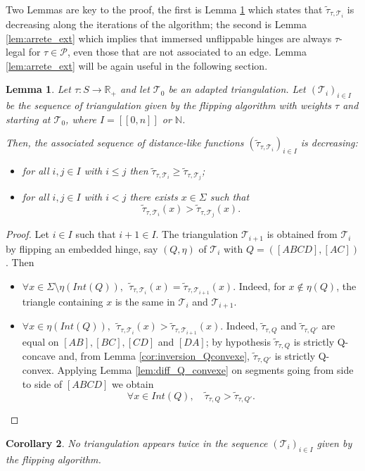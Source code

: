 \documentclass[a4paper,12pt]{article}
\def\NN{\mathbb N}
\def\lsem{[\![}
\def\rsem{]\!]}
\def\TT{\mathcal T}
\def\adm{\P}
\def\RR{\mathbb{R}}
\def\adm{\mathcal{P}}
\def\P{\mathcal{P}}
\newcommand{\tautilde}[2]{\widetilde\tau_{#1,#2}}
\newtheorem{lem}{Lemma}[section]		 %
\newtheorem{cor}[lem]{Corollary}
\theoremstyle{definition}
\begin{document}
						Two Lemmas are key to the proof, the first is Lemma \ref{lem:decroissante} which states that $\tautilde{\tau}{\TT_i}$ is decreasing along the iterations of the algorithm; the second is Lemma \ref{lem:arrete_ext} which implies that immersed unflippable hinges are always $\tau$-legal for $\tau\in \adm$, even those that are not associated to an edge. Lemma \ref{lem:arrete_ext} will be again useful in the following section.
												\begin{lem}\label{lem:decroissante}
						 Let $\tau: S \rightarrow \RR_+$ and let $\TT_0$ be an adapted triangulation. Let $(\TT_i)_{i\in I}$ be the sequence of triangulation given by 
						 the flipping algorithm with weights $\tau$ and starting at $\TT_0$, where
						 $I=\lsem 0,n\rsem$ or
						 $\NN$.

						 Then, the associated sequence of distance-like functions $(\tautilde{\tau}{\TT_i})_{i\in I}$ is decreasing:
						 \begin{itemize}
						 \item for all $i,j\in I$ with $i\leq j$ then $\tautilde{\tau}{\TT_i}\geq \tautilde{\tau}{\TT_j}$;
						 \item for all $i,j\in I$ with $i<j$ there exists $x\in \Sigma$ such that $$\tautilde{\tau}{\TT_i}(x)> \tautilde{\tau}{\TT_j}(x).$$
						 \end{itemize}
						\end{lem}
						\begin{proof} Let $i\in I$ such that $i+1\in I$.
						The triangulation $\TT_{i+1}$ is obtained from $\TT_i$ by flipping an embedded hinge, say $(Q,\eta)$ of $\TT_i$ with $Q=([ABCD],[AC])$.
						Then
						\begin{itemize}
						 \item $\forall x\in \Sigma\setminus \eta(Int(Q)),~~ \tautilde{\tau}{\TT_i}(x)=
						 \tautilde{\tau}{\TT_{i+1}}(x)$.
						Indeed, for $x\notin \eta(Q)$, the triangle containing $x$ is the same in $\TT_i$ and $\TT_{i+1}$.

						 \item $\forall x\in \eta(Int(Q)),~~ \tautilde{\tau}{\TT_i}(x)>\tautilde{\tau}{\TT_{i+1}}(x)$.
								Indeed, $\tautilde{\tau}{Q}$ and $\tautilde{\tau}{Q'}$ are equal on $[AB],[BC],[CD]$ and $[DA]$; by hypothesis
								$\tautilde{\tau}{Q}$ is strictly Q-concave and, from Lemma \ref{cor:inversion_Qconvexe}, $\tautilde{\tau}{Q'}$ is strictly Q-convex. Applying Lemma \ref{lem:diff_Q_convexe} on segments going from side to side of $[ABCD]$
								we obtain 
								$$\forall x\in Int(Q), \quad \tautilde{\tau}{Q} > \tautilde{\tau}{Q'}.$$
						\end{itemize}
						\end{proof}
						\begin{cor}\label{cor:flip_injective}
							No triangulation appears twice in the sequence $(\TT_i)_{i\in I}$ given by the flipping algorithm.
						\end{cor}
\end{document}
